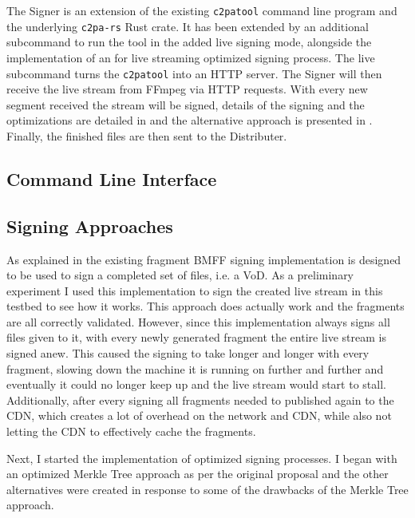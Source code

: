 The Signer is an extension of the existing \texttt{c2patool} command line program and the underlying \texttt{c2pa-rs} Rust crate. It has been extended by an additional subcommand to run the tool in the added live signing mode, alongside the implementation of an for live streaming optimized signing process. The live subcommand turns the \texttt{c2patool} into an HTTP server. The Signer will then receive the live stream from FFmpeg via HTTP requests. With every new segment received the stream will be signed, details of the signing and the optimizations are detailed in  and the alternative approach is presented in . Finally, the finished files are then sent to the Distributer.


\subsection{Command Line Interface\label{sec:cli_signer}}


\subsection{Signing Approaches}

As explained in  the existing fragment BMFF signing implementation is designed to be used to sign a completed set of files, i.e. a VoD. As a preliminary experiment I used this implementation to sign the created live stream in this testbed to see how it works. This approach does actually work and the fragments are all correctly validated. However, since this implementation always signs all files given to it, with every newly generated fragment the entire live stream is signed anew. This caused the signing to take longer and longer with every fragment, slowing down the machine it is running on further and further and eventually it could no longer keep up and the live stream would start to stall. Additionally, after every signing all fragments needed to published again to the CDN, which creates a lot of overhead on the network and CDN, while also not letting the CDN to effectively cache the fragments.

Next, I started the implementation of optimized signing processes. I began with an optimized Merkle Tree approach as per the original proposal and the other alternatives were created in response to some of the drawbacks of the Merkle Tree approach.

